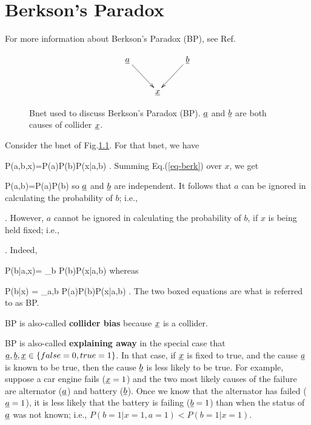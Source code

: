 \chapter{Berkson's Paradox}
\label{ch-berkson}

For more information
about Berkson's Paradox (BP), see
Ref.\cite{wiki-berkson}


\begin{figure}[h!]
$$
\xymatrix{
\rva\ar[rd]
&&\rvb\ar[ld]
\\
&\rvx
}
$$
\caption{
Bnet used to discuss Berkson's Paradox (BP).
$\rva$ and $\rvb$ are both causes of
collider
$\rvx$.}
\label{fig-berkson-bnet}
\end{figure}

Consider the bnet of Fig.\ref{fig-berkson-bnet}.
For that bnet, we have

\beq
P(a,b,x)=P(a)P(b)P(x|a,b)
\;.
\label{eq-berk}
\eeq
Summing Eq.(\ref{eq-berk}) over $x$, we get

\beq
P(a,b)=P(a)P(b)
\eeq
so $\rva$ and $\rvb$ are independent.
It follows that
$a$ can be ignored in calculating
the probability of $b$; i.e.,

\beq
{}
\;.
\eeq
However,
$a$ cannot be ignored in calculating
the probability of $b$,
if $x$ is being held fixed; i.e., 
 

\beq
{}
\;.
\eeq
Indeed,

\beq
P(b|a,x)=
{\sum_b P(b)P(x|a,b)}
\eeq
whereas

\beq
P(b|x)
=
{\sum_{a,b} P(a)P(b)P(x|a,b)}
\;.
\eeq
The two boxed 
equations are
what is referred to as BP.


BP is also-called  {\bf collider bias} because
$\rvx$ is a collider.

BP is also-called {\bf explaining away}
in the special case that
$\rva,\rvb, \rvx\in \{false=0, true=1\}$.
In that case, if $\rvx$ is fixed
to true, and the cause
$\rva$ is known to be true, 
then the cause $\rvb$ is
less likely
to be true.
For example,
suppose a car engine fails ($\rvx=1$)
and the two most likely
causes of the failure
are alternator ($\rva$)
and battery ($\rvb$).
Once we know
that the alternator has failed
 ($\rva=1$), it is 
less likely that the
battery is failing ($\rvb=1$)
than when the status of
$\rva$ was not known; i.e., 
$P(b=1|x=1,a=1)<P(b=1|x=1)$.


